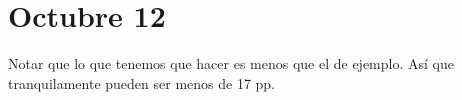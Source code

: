 \section{Octubre 12}

Notar que lo que tenemos que hacer es menos que el de ejemplo.
Así que tranquilamente pueden ser menos de 17 pp.
